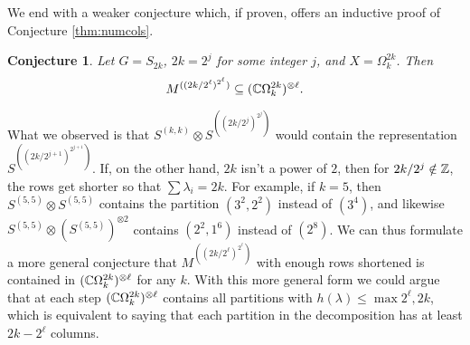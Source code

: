 \documentclass[12pt,twoside]{reedthesis}
\theoremstyle{plain}   %
\newtheorem{conj}{Conjecture}[section]
\theoremstyle{definition}
\theoremstyle{remark}
\numberwithin{equation}{section}
\begin{document}
We end with a weaker conjecture which, if proven, offers an inductive proof of Conjecture \ref{thm:numcols}.
\begin{conj}
  Let $G = S_{2k}$, $2k = 2^j$ for some integer $j$, and $X= \Omega_k^{2k}$. Then
  \[ M^{((2k / 2^\ell)^{2^\ell})} \subseteq (\mathbb{C}\Omega_k^{2k})^{\otimes \ell}.\]
\end{conj}
What we observed is that $S^{(k,k)} \otimes S^{((2k / 2^j)^{2^j})}$ would contain the representation $S^{((2k / 2^{j+1} )^{2^{j+1}})}$.
If, on the other hand, $2k$ isn't a power of $2$,
then for $2k/2^j \notin \mathbb{Z}$, the rows get shorter so that $\sum \lambda_i = 2k$.
For example, if $k = 5$, then $S^{(5,5)} \otimes S^{(5,5)}$ contains the partition $(3^2,2^2)$ instead of $(3^4)$, and likewise $S^{(5,5)} \otimes (S^{(5,5)})^{\otimes 2}$ contains $(2^2,1^6)$ instead of $(2^8)$.
We can thus formulate a more general conjecture that $M^{((2k / 2^\ell)^{2^\ell})}$ with enough rows shortened is contained in $(\mathbb{C}\Omega_k^{2k})^{\otimes \ell}$ for any $k$.
With this more general form we could argue that at each step $(\mathbb{C}\Omega_k^{2k})^{\otimes \ell}$ contains all partitions with $h(\lambda) \leq \max{2^\ell,2k}$,
which is equivalent to saying that each partition in the decomposition has at least $2k - 2^\ell$ columns.
\end{document}
